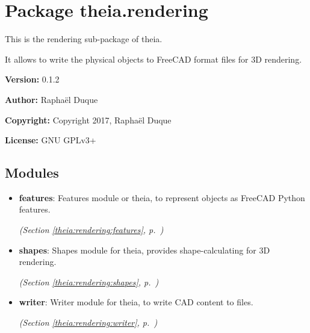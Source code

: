 %
%
%


\section{Package theia.rendering}

    \label{theia:rendering}
This is the rendering sub-package of theia.

It allows to write the physical objects to FreeCAD format files for 3D 
rendering.

\textbf{Version:} 0.1.2



\textbf{Author:} Raphaël Duque



\textbf{Copyright:} Copyright 2017, Raphaël Duque



\textbf{License:} GNU GPLv3+





\subsection{Modules}

\begin{itemize}
\setlength{\parskip}{0ex}
\item \textbf{features}: Features module or theia, to represent objects as FreeCAD Python features.



  \textit{(Section \ref{theia:rendering:features}, p.~\pageref{theia:rendering:features})}

\item \textbf{shapes}: Shapes module for theia, provides shape-calculating for 3D rendering.



  \textit{(Section \ref{theia:rendering:shapes}, p.~\pageref{theia:rendering:shapes})}

\item \textbf{writer}: Writer module for theia, to write CAD content to files.



  \textit{(Section \ref{theia:rendering:writer}, p.~\pageref{theia:rendering:writer})}

\end{itemize}

